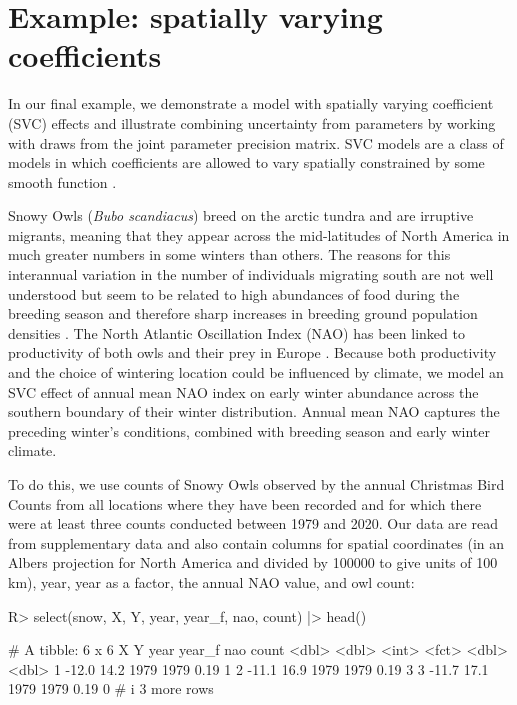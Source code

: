 \documentclass[article]{jss}\usepackage[]{graphicx}\usepackage[dvipsnames]{xcolor}
\begin{document}
\clearpage

\section{Example: spatially varying coefficients} \label{svc-owls}

In our final example, we demonstrate a model with spatially varying coefficient (SVC) effects and illustrate combining uncertainty from parameters by working with draws from the joint parameter precision matrix.
SVC models are a class of models in which coefficients are allowed to vary spatially constrained by some smooth function \citep{hastie1993, thorson2023SVC}.

Snowy Owls (\emph{Bubo scandiacus}) breed on the arctic tundra and are irruptive migrants, meaning that they appear across the mid-latitudes of North America in much greater numbers in some winters than others.
The reasons for this interannual variation in the number of individuals migrating south are not well understood but seem to be related to high abundances of food during the breeding season and therefore sharp increases in breeding ground population densities \citep{robillard2016}.
The North Atlantic Oscillation Index (NAO) has been linked to productivity of both owls and their prey in Europe \citep{millon2014}.
Because both productivity and the choice of wintering location could be influenced by climate, we model an SVC effect of annual mean NAO index on early winter abundance across the southern boundary of their winter distribution.
Annual mean NAO captures the preceding winter's conditions, combined with breeding season and early winter climate.

To do this, we use counts of Snowy Owls observed by the annual Christmas Bird Counts \citep{cbc} from all locations where they have been recorded and for which there were at least three counts conducted between 1979 and 2020.
Our data are read from supplementary data and also contain columns for spatial coordinates (in an Albers projection for North America and divided by 100000 to give units of 100 km), year, year as a factor, the annual NAO value, and owl count:



\begin{Schunk}
\begin{Sinput}
R> select(snow, X, Y, year, year_f, nao, count) |> head()
\end{Sinput}
\begin{Soutput}
# A tibble: 6 x 6
      X     Y  year year_f   nao count
  <dbl> <dbl> <int> <fct>  <dbl> <dbl>
1 -12.0  14.2  1979 1979    0.19     1
2 -11.1  16.9  1979 1979    0.19     3
3 -11.7  17.1  1979 1979    0.19     0
# i 3 more rows
\end{Soutput}
\end{Schunk}
\end{document}
